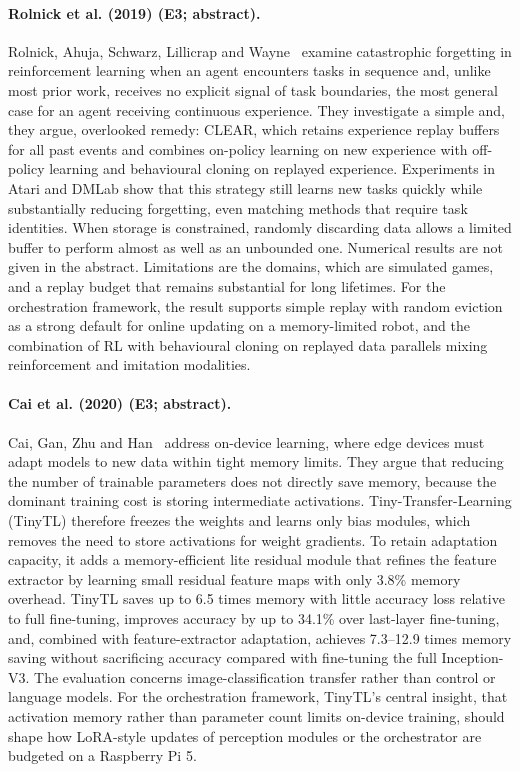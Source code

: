 \documentclass[10pt,a4paper]{article}
\begin{document}
\paragraph{Rolnick et al. (2019) (E3; abstract).} Rolnick, Ahuja, Schwarz, Lillicrap and Wayne~\cite{Rolnick2019} examine catastrophic forgetting in reinforcement learning when an agent encounters tasks in sequence and, unlike most prior work, receives no explicit signal of task boundaries, the most general case for an agent receiving continuous experience. They investigate a simple and, they argue, overlooked remedy: CLEAR, which retains experience replay buffers for all past events and combines on-policy learning on new experience with off-policy learning and behavioural cloning on replayed experience. Experiments in Atari and DMLab show that this strategy still learns new tasks quickly while substantially reducing forgetting, even matching methods that require task identities. When storage is constrained, randomly discarding data allows a limited buffer to perform almost as well as an unbounded one. Numerical results are not given in the abstract. Limitations are the domains, which are simulated games, and a replay budget that remains substantial for long lifetimes. For the orchestration framework, the result supports simple replay with random eviction as a strong default for online updating on a memory-limited robot, and the combination of RL with behavioural cloning on replayed data parallels mixing reinforcement and imitation modalities.

\paragraph{Cai et al. (2020) (E3; abstract).} Cai, Gan, Zhu and Han~\cite{Cai2020} address on-device learning, where edge devices must adapt models to new data within tight memory limits. They argue that reducing the number of trainable parameters does not directly save memory, because the dominant training cost is storing intermediate activations. Tiny-Transfer-Learning (TinyTL) therefore freezes the weights and learns only bias modules, which removes the need to store activations for weight gradients. To retain adaptation capacity, it adds a memory-efficient lite residual module that refines the feature extractor by learning small residual feature maps with only 3.8\% memory overhead. TinyTL saves up to 6.5 times memory with little accuracy loss relative to full fine-tuning, improves accuracy by up to 34.1\% over last-layer fine-tuning, and, combined with feature-extractor adaptation, achieves 7.3--12.9 times memory saving without sacrificing accuracy compared with fine-tuning the full Inception-V3. The evaluation concerns image-classification transfer rather than control or language models. For the orchestration framework, TinyTL's central insight, that activation memory rather than parameter count limits on-device training, should shape how LoRA-style updates of perception modules or the orchestrator are budgeted on a Raspberry Pi 5.
\end{document}
